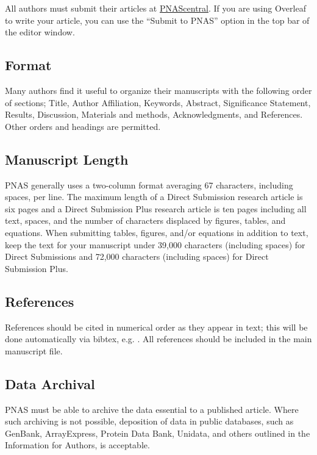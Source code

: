 \documentclass[9pt,twocolumn,twoside,lineno]{pnas-new}
\begin{document}
All authors must submit their articles at \href{http://www.pnascentral.org/cgi-bin/main.plex}{PNAScentral}. If you are using Overleaf to write your article, you can use the ``Submit to PNAS'' option in the top bar of the editor window. 

\subsection*{Format}

Many authors find it useful to organize their manuscripts with the following order of sections;  Title, Author Affiliation, Keywords, Abstract, Significance Statement, Results, Discussion, Materials and methods, Acknowledgments, and References. Other orders and headings are permitted.

\subsection*{Manuscript Length}

PNAS generally uses a two-column format averaging 67 characters, including spaces, per line. The maximum length of a Direct Submission research article is six pages and a Direct Submission Plus research article is ten pages including all text, spaces, and the number of characters displaced by figures, tables, and equations.  When submitting tables, figures, and/or equations in addition to text, keep the text for your manuscript under 39,000 characters (including spaces) for Direct Submissions and 72,000 characters (including spaces) for Direct Submission Plus.

\subsection*{References}

References should be cited in numerical order as they appear in text; this will be done automatically via bibtex, e.g. . All references should be included in the main manuscript file.  

\subsection*{Data Archival}

PNAS must be able to archive the data essential to a published article. Where such archiving is not possible, deposition of data in public databases, such as GenBank, ArrayExpress, Protein Data Bank, Unidata, and others outlined in the Information for Authors, is acceptable.
\end{document}
